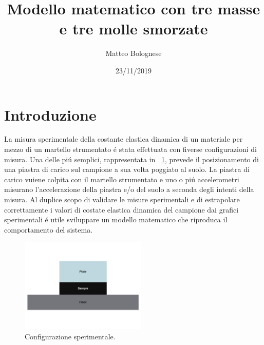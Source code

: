 \documentclass[12pt,a4paper]{article}
\begin{document}
 	\title{Modello matematico con tre masse e tre molle smorzate} \author{Matteo Bolognese}
 	\date{23/11/2019}
 	\maketitle
 	
 \section{Introduzione}
	La misura sperimentale della costante elastica dinamica di un materiale per mezzo di un martello strumentato \'e stata effettuata con fiverse configurazioni di misura. Una delle pi\'u semplici, rappresentata in \figurename~\ref{fig:Phisical-configuration}, prevede il posizionamento di una piastra di carico sul campione a sua volta poggiato al suolo. La piastra di carico vuiene colpita con il martello strumentato e uno o pi\'u accelerometri misurano l'accelerazione della piastra e/o del suolo a seconda degli intenti della misura.
	Al duplice scopo di validare le misure sperimentali e di estrapolare correttamente i valori di costate elastica dinamica del campione dai grafici sperimentali \'e utile sviluppare un modello matematico che riproduca il comportamento del sistema.
	
	\begin{figure}
		\centering
		\includegraphics[width=6cm]{Phisical-system}
		\caption{Configurazione sperimentale.}
		\label{fig:Phisical-configuration}
	\end{figure}
 	
\end{document}
